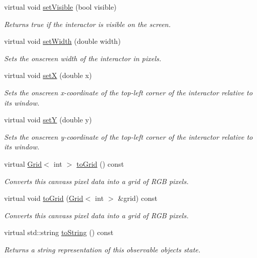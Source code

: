 \begin{DoxyCompactItemize}
virtual void \mbox{\hyperlink{classGInteractor_a18e44e30b31525a243960ca3928125aa}{set\+Visible}} (bool visible)
\begin{DoxyCompactList}\small\item\em Returns true if the interactor is visible on the screen. \end{DoxyCompactList}\item 
virtual void \mbox{\hyperlink{classGInteractor_aa3f3fba4cb131baa8696ba01e3bceca1}{set\+Width}} (double width)
\begin{DoxyCompactList}\small\item\em Sets the onscreen width of the interactor in pixels. \end{DoxyCompactList}\item 
virtual void \mbox{\hyperlink{classGInteractor_a9c18fcc579333bf9653d13ad2b372e39}{setX}} (double x)
\begin{DoxyCompactList}\small\item\em Sets the onscreen x-\/coordinate of the top-\/left corner of the interactor relative to its window. \end{DoxyCompactList}\item 
virtual void \mbox{\hyperlink{classGInteractor_a7d57e2a5c35d27feb58fd498a3cf82b9}{setY}} (double y)
\begin{DoxyCompactList}\small\item\em Sets the onscreen y-\/coordinate of the top-\/left corner of the interactor relative to its window. \end{DoxyCompactList}\item 
virtual \mbox{\hyperlink{classGrid}{Grid}}$<$ int $>$ \mbox{\hyperlink{classGCanvas_a2f9b15856aaf66aa95cfd7405bd972cc}{to\+Grid}} () const
\begin{DoxyCompactList}\small\item\em Converts this canvas\textquotesingle{}s pixel data into a grid of R\+GB pixels. \end{DoxyCompactList}\item 
virtual void \mbox{\hyperlink{classGCanvas_a11c06bec679dda1519ed914bca68900a}{to\+Grid}} (\mbox{\hyperlink{classGrid}{Grid}}$<$ int $>$ \&grid) const
\begin{DoxyCompactList}\small\item\em Converts this canvas\textquotesingle{}s pixel data into a grid of R\+GB pixels. \end{DoxyCompactList}\item 
virtual std\+::string \mbox{\hyperlink{classGObservable_a1fe5121d6528fdea3f243321b3fa3a49}{to\+String}} () const
\begin{DoxyCompactList}\small\item\em Returns a string representation of this observable object\textquotesingle{}s state. \end{DoxyCompactList}\end{DoxyCompactItemize}

